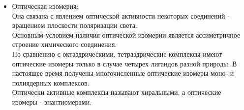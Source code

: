 \begin{itemize}
	\item Оптическая изомерия: \\
	Она связана с явлением оптической активности некоторых соединений - вращением плоскости поляризации света. \\
	Основным условием наличия оптической изомерии является ассиметричное строение химического соединения. \\
	По сравнению с октаэдрическими, тетраэдрические комплексы имеют оптические изомеры только в случае четырех лигандов разной природы. В настоящее время получены многочисленные оптические изомеры моно- и полиядерных комплексов. \\ Оптически активные комплексы называют хиральными, а оптические изомеры - энантиомерами.
	\begin{figure} [H]
		\centering {\texttt{[image: qq6]}}
	\end{figure}
\end{itemize}

